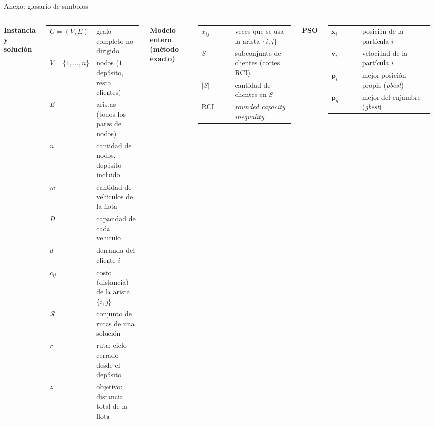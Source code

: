 \documentclass[aspectratio=169, 11pt, xcolor={dvipsnames,table}]{beamer}
\newcommand{\azul}[1]{\textcolor{UsachAzul}{#1}}
\newcommand{\xx}{\mathbf{x}_i}
\newcommand{\vv}{\mathbf{v}_i}
\newcommand{\pp}{\mathbf{p}_i}
\newcommand{\pg}{\mathbf{p}_g}
\begin{document}
\begin{frame}[noframenumbering]{Anexo: glosario de símbolos}
\scriptsize
\begin{columns}[T]
\textbf{\azul{Instancia y solución}}\par\smallskip
\setlength{\tabcolsep}{4pt}
\begin{tabular}{@{}l p{0.64\linewidth}@{}}
\toprule
$G=(V,E)$ & grafo completo no dirigido \\
$V=\{1,\dots,n\}$ & nodos ($1$ = depósito, resto clientes) \\
$E$ & aristas (todos los pares de nodos) \\
$n$ & cantidad de nodos, depósito incluido \\
$m$ & cantidad de vehículos de la flota \\
$D$ & capacidad de cada vehículo \\
$d_i$ & demanda del cliente $i$ \\
$c_{ij}$ & costo (distancia) de la arista $\{i,j\}$ \\
$\mathcal{R}$ & conjunto de rutas de una solución \\
$r$ & ruta: ciclo cerrado desde el depósito \\
$z$ & objetivo: distancia total de la flota \\
\bottomrule
\end{tabular}
\par\medskip
\textbf{\azul{Modelo entero (método exacto)}}\par\smallskip
\begin{tabular}{@{}l p{0.64\linewidth}@{}}
\toprule
$x_{ij}$ & veces que se usa la arista $\{i,j\}$ \\
$S$ & subconjunto de clientes (cortes RCI) \\
$|S|$ & cantidad de clientes en $S$ \\
RCI & \textit{rounded capacity inequality} \\
\bottomrule
\end{tabular}
\textbf{\azul{PSO}}\par\smallskip
\setlength{\tabcolsep}{4pt}
\begin{tabular}{@{}l p{0.70\linewidth}@{}}
\toprule
$\xx$ & posición de la partícula $i$ \\
$\vv$ & velocidad de la partícula $i$ \\
$\pp$ & mejor posición propia (\textit{pbest}) \\
$\pg$ & mejor del enjambre (\textit{gbest}) \\

\end{tabular}
\end{columns}
\end{frame}
\end{document}
